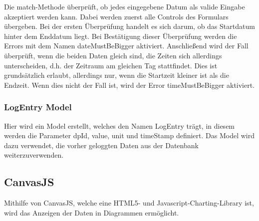 Die match-Methode überprüft, ob jedes eingegebene Datum als valide Eingabe akzeptiert werden kann. Dabei werden zuerst alle Controls des Formulars übergeben. Bei der ersten Überprüfung handelt es sich darum, ob das Startdatum hinter dem Enddatum liegt. Bei Bestätigung dieser Überprüfung werden die Errors mit dem Namen dateMustBeBigger aktiviert. Anschließend wird der Fall überprüft, wenn die beiden Daten gleich sind, die Zeiten sich allerdings unterscheiden, d.h. der Zeitraum am gleichen Tag stattfindet. Dies ist grundsätzlich erlaubt, allerdings nur, wenn die Startzeit kleiner ist als die Endzeit. Wenn dies nicht der Fall ist, wird der Error timeMustBeBigger aktiviert.
 
\subsubsection{LogEntry Model}
Hier wird ein Model erstellt, welches den Namen LogEntry trägt, in diesem werden die Parameter dpId, value, unit und timeStamp definiert. Das Model wird dazu verwendet, die vorher geloggten Daten aus der Datenbank weiterzuverwenden.
 
\subsection{CanvasJS}
Mithilfe von CanvasJS, welche eine HTML5- und Javascript-Charting-Library ist, wird das Anzeigen der Daten in Diagrammen ermöglicht.
